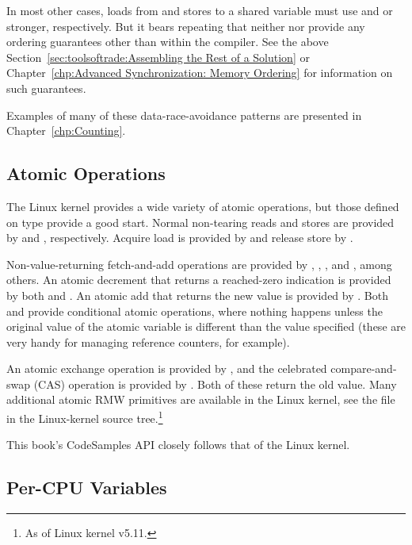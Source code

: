 In most other cases, loads from and stores to a shared variable must
use  and  or stronger, respectively.
But it bears repeating that neither  nor 
provide any ordering guarantees other than within the compiler.
See the above
Section~\ref{sec:toolsoftrade:Assembling the Rest of a Solution} or
Chapter~\ref{chp:Advanced Synchronization: Memory Ordering}
for information on such guarantees.

Examples of many of these data-race-avoidance patterns are presented in
Chapter~\ref{chp:Counting}.

\subsection{Atomic Operations}
\label{sec:toolsoftrade:Atomic Operations}

The Linux kernel provides a wide variety of atomic operations, but
those defined on type  provide a good start.
Normal non-tearing reads and stores are provided by
 and , respectively.
Acquire load is provided by  and release
store by .

Non-value-returning fetch-and-add operations are provided by
, , , and
, among others.
An atomic decrement that returns a reached-zero indication is provided
by both  and .
An atomic add that returns the new value is provided by
.
Both  and  provide
conditional atomic operations, where nothing happens unless the
original value of the atomic variable is different than the value
specified (these are very handy for managing reference counters, for
example).

An atomic exchange operation is provided by , and
the celebrated compare-and-swap (CAS) operation is provided by
.
Both of these return the old value.
Many additional atomic RMW primitives are available in the Linux kernel,
see the  file in the Linux-kernel
source tree.\footnote{
	As of Linux kernel v5.11.
}

This book's CodeSamples API closely follows that of the Linux kernel.

\subsection{Per-CPU Variables}
\label{sec:toolsoftrade:Per-CPU Variables}

